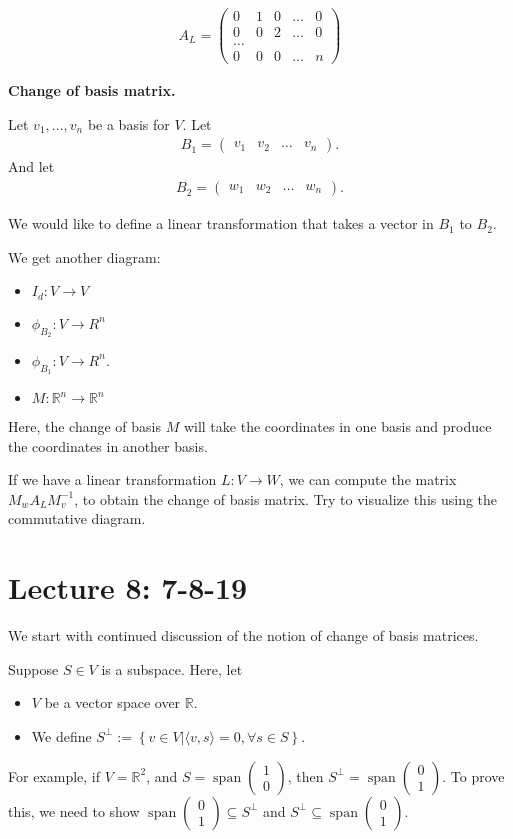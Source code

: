 \documentclass{article}
\newcommand{\mat}[1]{\begin{pmatrix}#1\end{pmatrix}}
\newcommand{\RR}{\mathbb{R}}
\DeclareMathOperator{\Span}{span}
\begin{document}
\begin{align*}
  A_L = \mat{0 & 1 & 0 & \dots & 0 \\ 0 & 0 & 2 & \dots & 0 \\ \dots \\ 0 & 0 & 0 & \dots & n}
\end{align*}

{\bf Change of basis matrix.}

Let $v_1, \dots, v_n$ be a basis for $V$.  Let
\begin{align*}
  B_1 = \mat{v_1 & v_2 & \dots & v_n}.
\end{align*}
And let
\begin{align*}
  B_2 = \mat{w_1 & w_2 & \dots & w_n}.
\end{align*}

We would like to define a linear transformation that takes a vector in $B_1$ to $B_2$.

We get another diagram:
\begin{itemize}
  \item $I_d: V \to V$
  \item $\phi_{B_2}: V \to R^n$
  \item $\phi_{B_1}: V \to R^n$.
  \item $M: \RR^n \to \RR^n$
\end{itemize}
Here, the change of basis $M$ will take the coordinates in one basis and produce the coordinates in another basis.

If we have a linear transformation $L: V \to W$, we can compute the matrix $M_w A_L M_v^{-1}$, to obtain the change of basis matrix.  Try to visualize this using the commutative diagram.

\section{Lecture 8: 7-8-19}

We start with continued discussion of the notion of change of basis matrices.

Suppose $S \in V$ is a subspace.  Here, let
\begin{itemize}
  \item $V$ be a vector space over $\RR$.
  \item We define $S^{\perp} := \left\{ v \in V | \langle v, s \rangle = 0, \forall s \in S \right\}$.
\end{itemize}

For example, if $V = \RR^2$, and $S = \Span \mat{1 \\ 0}$, then $S^{\perp} = \Span \mat{0 \\ 1}$.  To prove this, we need to show $\Span \mat{0 \\ 1} \subseteq S^{\perp}$ and $S^{\perp} \subseteq \Span \mat{0 \\ 1}$.
\end{document}
